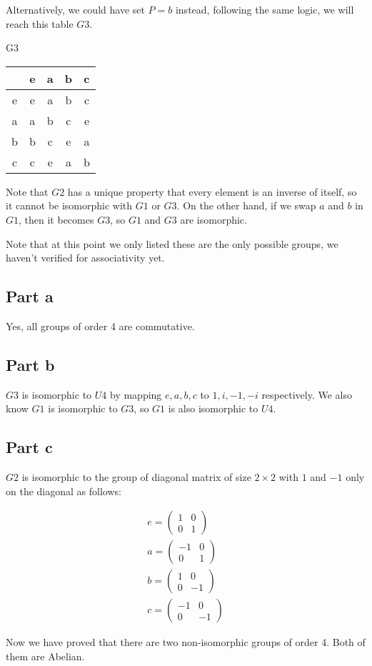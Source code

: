 Alternatively, we could have set $ P = b $ instead, following the same logic, we will reach this table $ G3 $.

G3

\begin{tabular}{ c|c|c|c|c }
    & e & a & b & c \\
  \hline
  e & e & a & b & c \\
  a & a & b & c & e \\
  b & b & c & e & a \\
  c & c & e & a & b 
\end{tabular}

Note that $ G2 $ has a unique property that every element is an inverse of itself, so it cannot be isomorphic with $ G1 $ or $ G3 $. On the other hand, if we swap $ a $ and $ b $ in $ G1 $, then it becomes $ G3 $, so $ G1 $ and $ G3 $ are isomorphic.

Note that at this point we only listed these are the only possible groups, we haven't verified for associativity yet.

\subsection*{Part a}
Yes, all groups of order 4 are commutative.

\subsection*{Part b}
$ G3 $ is isomorphic to $ U4 $ by mapping $ e, a, b, c $ to $ 1, i, -1, -i $ respectively. We also know $ G1 $ is isomorphic to $ G3 $, so $ G1 $ is also isomorphic to $ U4 $.

\subsection*{Part c}
$ G2 $ is isomorphic to the group of diagonal matrix of size $ 2 \times 2 $ with $ 1 $ and $ -1 $ only on the diagonal as follows:

\begin{eqnarray*}
    e = \left(\begin{array}{cc} 1 & 0 \\ 0 & 1 \end{array}\right) \\
    a = \left(\begin{array}{cc} -1 & 0 \\ 0 & 1 \end{array}\right) \\
    b = \left(\begin{array}{cc} 1 & 0 \\ 0 & -1 \end{array}\right) \\
    c = \left(\begin{array}{cc} -1 & 0 \\ 0 & -1 \end{array}\right)
\end{eqnarray*}

Now we have proved that there are two non-isomorphic groups of order 4. Both of them are Abelian.